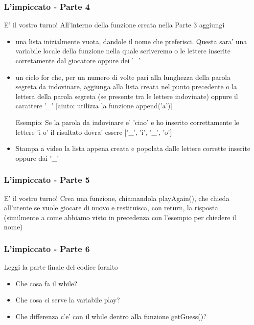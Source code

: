\begin{frame}[fragile]
\frametitle{L'impiccato - Parte 4}

\begin{block}{E' il vostro turno!}
All'interno della funzione creata nella Parte 3 aggiungi
    \begin{itemize}
        \item una lista inizialmente vuota, dandole il nome che preferisci. Questa sara' una variabile locale della funzione nella quale scriveremo o le lettere inserite corretamente dal giocatore oppure dei '\_'
        \item un ciclo for che, per un numero di volte pari alla lunghezza della parola segreta da indovinare, aggiunga alla lista creata nel punto precedente o la lettera della parola segreta (se presente tra le lettere indovinate) oppure il carattere '\_' [aiuto: utilizza la funzione append('a')]
        
        Esempio: Se la parola da indovinare e' 'ciao' e ho inserito correttamente le lettere 'i o' il risultato dovra' essere ['\_', 'i', '\_', 'o']
        \item Stampa a video la lista appena creata e popolata dalle lettere corrette inserite oppure dai '\_'
    \end{itemize}
\end{block}
\end{frame}

\begin{frame}[fragile]
\frametitle{L'impiccato - Parte 5}

\begin{block}{E' il vostro turno!}
Crea una funzione, chiamandola playAgain(), che chieda all'utente se vuole giocare di nuovo e restituisca, con return, la risposta (similmente a come abbiamo visto in precedenza con l'esempio per chiedere il nome)
\end{block}
\end{frame}

\begin{frame}[fragile]
\frametitle{L'impiccato - Parte 6}

\begin{block}{Leggi la parte finale del codice fornito}
    \begin{itemize}
        \item Che cosa fa il while?
        \item Che cosa ci serve la variabile play?
        \item Che differenza c'e' con il while dentro alla funzione getGuess()?
    \end{itemize}
\end{block}
\end{frame}